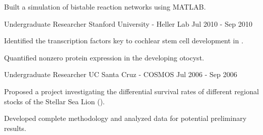 \begin{cventries}
    {
      \begin{cvitems} %
        \item Built a simulation of bistable reaction networks using MATLAB.
      \end{cvitems}
    }
  \cventry
    {Undergraduate Researcher} %
    {Stanford University - Heller Lab} %
    {} %
    {Jul 2010 - Sep 2010} %
    {
      \begin{cvitems} %
        \item Identified the transcription factors key to cochlear stem cell development in \gal.
        \item Quantified nonzero protein expression in the developing otocyst.
      \end{cvitems}
    }
  \cventry
    {Undergraduate Researcher} %
    {UC Santa Cruz - COSMOS} %
    {} %
    {Jul 2006 - Sep 2006} %
    {
      \begin{cvitems} %
        \item Proposed a project investigating the differential survival rates of different regional stocks of the Stellar Sea Lion (\ejub).
        \item Developed complete methodology and analyzed data for potential preliminary results.
      \end{cvitems}
    }
\fi
\end{cventries}
